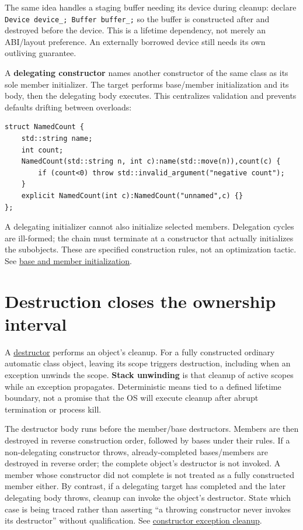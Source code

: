 The same idea handles a staging buffer needing its device during cleanup: declare \texttt{Device\ device\_;\ Buffer\ buffer\_;} so the buffer is constructed after and destroyed before the device. This is a lifetime dependency, not merely an ABI/layout preference. An externally borrowed device still needs its own outliving guarantee.

A \textbf{delegating constructor} names another constructor of the same class as its sole member initializer. The target performs base/member initialization and its body, then the delegating body executes. This centralizes validation and prevents defaults drifting between overloads:

\begin{verbatim}
struct NamedCount {
    std::string name;
    int count;
    NamedCount(std::string n, int c):name(std::move(n)),count(c) {
        if (count<0) throw std::invalid_argument("negative count");
    }
    explicit NamedCount(int c):NamedCount("unnamed",c) {}
};
\end{verbatim}

A delegating initializer cannot also initialize selected members. Delegation cycles are ill-formed; the chain must terminate at a constructor that actually initializes the subobjects. These are specified construction rules, not an optimization tactic. See \href{https://eel.is/c++draft/class.base.init}{base and member initialization}.

\section{Destruction closes the ownership interval}\label{01-foundations-i-ch003-destruction-closes-the-ownership-interval}

\hypertarget{01-foundations-i-ch003-destruction-closes-the-ownership-interval}{}

A \hyperref[appendix-9bfe377cef7a]{destructor} performs an object's cleanup. For a fully constructed ordinary automatic class object, leaving its scope triggers destruction, including when an exception unwinds the scope. \textbf{Stack unwinding} is that cleanup of active scopes while an exception propagates. Deterministic means tied to a defined lifetime boundary, not a promise that the OS will execute cleanup after abrupt termination or process kill.

The destructor body runs before the member/base destructors. Members are then destroyed in reverse construction order, followed by bases under their rules. If a non-delegating constructor throws, already-completed bases/members are destroyed in reverse order; the complete object's destructor is not invoked. A member whose constructor did not complete is not treated as a fully constructed member either. By contrast, if a delegating target has completed and the later delegating body throws, cleanup can invoke the object's destructor. State which case is being traced rather than asserting ``a throwing constructor never invokes its destructor'' without qualification. See \href{https://eel.is/c++draft/except.ctor}{constructor exception cleanup}.

